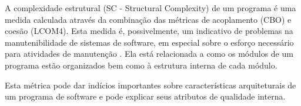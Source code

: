 A complexidade estrutural (SC - Structural Complexity) de um programa é uma
medida calculada através da combinação das métricas de acoplamento (CBO) e
coesão (LCOM4). Esta medida é, possivelmente, um indicativo de problemas na
manutenibilidade de sistemas de software, em especial sobre o esforço
necessário para atividades de manutenção \cite{Terceiro2012}. Ela está
relacionada a como os módulos de um programa estão organizados bem como à
estrutura interna de cada módulo.

Esta métrica pode dar indícios importantes sobre características arquiteturais
de um programa de software e pode explicar seus atributos de qualidade
interna.
